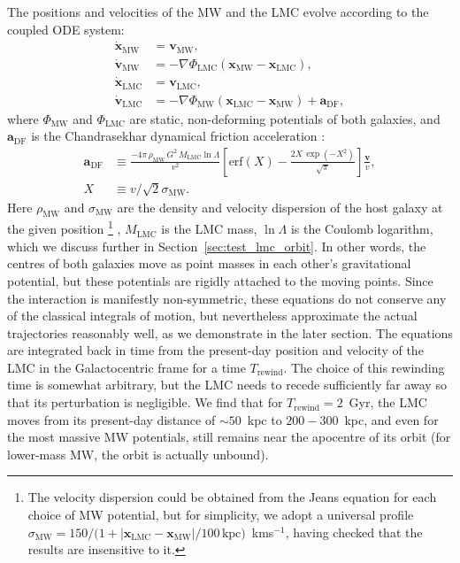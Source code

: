 \documentclass[usenatbib,fleqn]{mnras}
\newcommand{\kms}{km\:s$^{-1}$\xspace}
\begin{document}
The positions and velocities of the MW and the LMC evolve according to the coupled ODE system:
\begin{equation}  \label{eq:lmc_mw_orbit}
\begin{aligned}
\dot{\boldsymbol{x}}_\text{MW} &= \boldsymbol{v}_\text{MW}, \\
\dot{\boldsymbol{v}}_\text{MW} &= -\nabla\Phi_\text{LMC}(\boldsymbol{x}_\text{MW}-\boldsymbol{x}_\text{LMC}), \\
\dot{\boldsymbol{x}}_\text{LMC} &= \boldsymbol{v}_\text{LMC}, \\
\dot{\boldsymbol{v}}_\text{LMC} &= -\nabla\Phi_\text{MW}(\boldsymbol{x}_\text{LMC}-\boldsymbol{x}_\text{MW}) + \boldsymbol{a}_\text{DF}, 
\end{aligned}
\end{equation}
where $\Phi_\text{MW}$ and $\Phi_\text{LMC}$ are static, non-deforming potentials of both galaxies, and $\boldsymbol{a}_\text{DF}$ is the Chandrasekhar dynamical friction acceleration \citep[Equation~8.6]{Binney2008}:
\begin{equation}  \label{eq:dynfric}
\begin{aligned}
\boldsymbol{a}_\text{DF} &\equiv \frac{-4\pi\, \rho_\text{MW}\, G^2\, M_\text{LMC} \ln \Lambda}{v^2}\left[\text{erf}(X) - \frac{2X\,\exp(-X^2)}{\sqrt{\pi}}\right] \frac{\boldsymbol{v}}{v} , \\
X &\equiv v/ \sqrt{2}\sigma_\text{MW} .
\end{aligned}
\end{equation}
Here $\rho_\text{MW}$ and $\sigma_\text{MW}$ are the density and velocity dispersion of the host galaxy at the given position%
\footnote{The velocity dispersion could be obtained from the Jeans equation for each choice of MW potential, but for simplicity, we adopt a universal profile $\sigma_\text{MW} = 150 / \big(1 + |\boldsymbol x_\text{LMC}-\boldsymbol x_\text{MW}| / 100\,\text{kpc}\big)$~\kms, having checked that the results are insensitive to it.}%
, $M_\text{LMC}$ is the LMC mass, $\ln\Lambda$ is the Coulomb logarithm, which we discuss further in Section~\ref{sec:test_lmc_orbit}. In other words, the centres of both galaxies move as point masses in each other's gravitational potential, but these potentials are rigidly attached to the moving points. Since the interaction is manifestly non-symmetric, these equations do not conserve any of the classical integrals of motion, but nevertheless approximate the actual trajectories reasonably well, as we demonstrate in the later section. The equations are integrated back in time from the present-day position and velocity of the LMC in the Galactocentric frame for a time $T_\text{rewind}$. The choice of this rewinding time is somewhat arbitrary, but the LMC needs to recede sufficiently far away so that its perturbation is negligible. We find that for $T_\text{rewind}=2$~Gyr, the LMC moves from its present-day distance of $\sim 50$~kpc to $200-300$~kpc, and even for the most massive MW potentials, still remains near the apocentre of its orbit (for lower-mass MW, the orbit is actually unbound).
\end{document}
